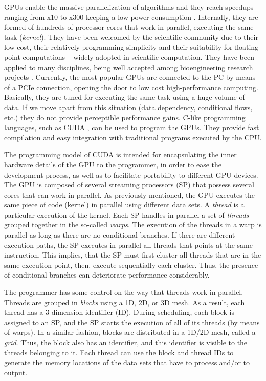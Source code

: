 \documentclass[runningheads]{llncs}
\begin{document}
GPUs enable the massive parallelization of algorithms and they reach speedups ranging from x10 to x300 \cite{j:nickolls10} keeping a low power consumption  \cite{j:brodt10}. Internally, they are formed of hundreds of processor cores that work in parallel, executing the same task (\emph{kernel}). They have been welcomed by the scientific community due to their low cost, their relatively programming simplicity and their suitability for floating-point computations -- widely adopted in scientific computation. They have been applied to many disciplines, being well accepted among bioengineering research projects \cite{b:kirk10,j:nickolls10}. Currently, the most popular GPUs are connected to the PC by means of a PCIe connection, opening the door to low cost high-performance computing.
  Basically, they are tuned for executing the same task using a huge volume of data. If we move apart from this situation (data dependency, conditional flows, etc.) they do not provide perceptible performance gains. C-like programming languages, such as CUDA \cite{b:kirk10}, can be used to program the GPUs. They provide fast compilation and easy integration with traditional  programs executed by the CPU.

The programming model of CUDA is intended for encapsulating the inner hardware details of the GPU to the programmer, in order to ease the development process, as well as to facilitate portability to different GPU devices. The GPU is composed of several streaming processors (SP) that possess several cores that can work in parallel. As previously mentioned, the GPU executes the same piece of code (kernel) in parallel using different data sets. A \emph{thread} is a particular execution of the kernel. Each SP handles in parallel a set of \emph{threads} grouped together in the so-called \emph{warps}. The execution of the threads in a warp is parallel as long as there are no conditional branches. If there are different execution paths, the SP executes in parallel all threads that points at the same instruction. This implies, that the SP must first cluster all threads that are in the same execution point, then, execute sequentially each cluster. Thus, the presence of conditional branches can deteriorate  performance considerably.

The programmer has some control on the way that threads work in parallel. Threads are grouped in \emph{blocks} using a 1D, 2D, or 3D mesh. As a result, each thread has a 3-dimension identifier (ID). During scheduling, each block is assigned to an SP, and the SP starts the execution of all of its threads (by means of warps). In a similar fashion, blocks are distributed in a 1D/2D mesh, called a \emph{grid}. Thus, the block also has an identifier, and this identifier is visible to the threads belonging to it. Each thread can use the block and thread IDs to generate the memory locations of the data sets that have to process and/or to output.
\end{document}
